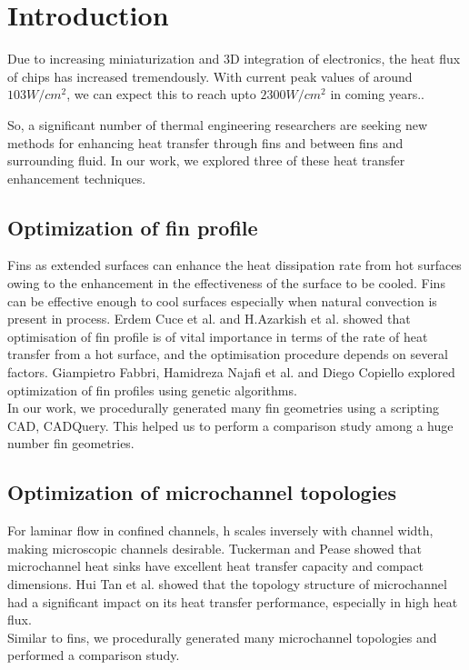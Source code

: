 \documentclass[../main.tex]{subfiles}
\begin{document}
\section{Introduction}

Due to increasing miniaturization and 3D integration of electronics,
the heat flux of chips has increased tremendously.
With current peak values of around $103 W/cm^2$,
we can expect this to reach upto $2300 W/cm^2$ in coming years..

So, a significant number of thermal engineering researchers are seeking new methods for enhancing heat transfer through fins and between fins and surrounding fluid.
In our work, we explored three of these heat transfer enhancement techniques.

\subsection{Optimization of fin profile}
Fins as extended surfaces can enhance the heat dissipation rate from hot surfaces owing to the enhancement in
the effectiveness of the surface to be cooled. Fins can be effective enough to cool surfaces especially when natural convection is present in process.
Erdem Cuce et al.  and H.Azarkish et al.  showed that optimisation of fin profile is of vital importance in terms of the rate of heat transfer from a hot surface,
and the optimisation procedure depends on several factors.
Giampietro Fabbri,  Hamidreza Najafi et al.  and Diego Copiello  explored optimization of fin profiles using genetic algorithms.
\\
In our work, we procedurally generated many fin geometries using a scripting CAD, CADQuery.
This helped us to perform a comparison study among a huge number fin geometries.

\subsection{Optimization of microchannel topologies}
For laminar flow in confined channels, h scales inversely with channel width, making microscopic
channels desirable. Tuckerman and Pease  showed that microchannel heat sinks have excellent heat transfer capacity and compact dimensions.
Hui Tan et al.  showed that the topology structure of microchannel had a significant impact on its heat transfer
performance, especially in high heat flux.
\\
Similar to fins, we procedurally generated many microchannel topologies and performed a comparison study.
\end{document}
